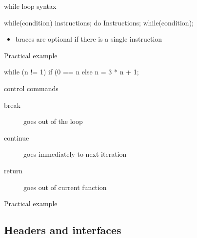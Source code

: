\begin{frame}[fragile]
  \begin{block}{while loop syntax}
    \begin{cppcode*}{}
      while(condition) {
        instructions;
      }
      do {
        Instructions;
      } while(condition);
    \end{cppcode*}
    \vspace{-0.3cm}
    \begin{itemize}
      \item braces are optional if there is a single instruction
    \end{itemize}
  \end{block}
  \pause
  \begin{exampleblock}{Practical example}
    \begin{cppcode*}{}
      while (n != 1)
        if (0 == n%
        else n = 3 * n + 1;
    \end{cppcode*}
  \end{exampleblock}
\end{frame}

\begin{frame}[fragile]
  \begin{block}{control commands}
    \begin{description}
    \item[break] goes out of the loop
    \item[continue] goes immediately to next iteration
    \item[return] goes out of current function
    \end{description}
  \end{block}
  \pause
  \begin{exampleblock}{Practical example}
  \end{exampleblock}
\end{frame}

\subsection[.h]{Headers and interfaces}

